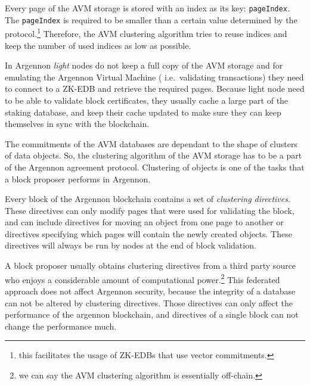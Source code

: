 Every page of the AVM storage is stored with an index as its key: \texttt{pageIndex}. The \texttt{pageIndex} is
required to be smaller than a certain value determined by the
protocol.\footnote{this facilitates the usage of ZK-EDBs that use vector commitments.}
Therefore, the AVM clustering algorithm tries to reuse indices and keep the number of used indices as low as
possible.

In Argennon \emph{light} nodes do not keep a full copy of the AVM storage and for emulating the Argennon Virtual Machine
( i.e.~validating transactions) they need to connect to a ZK-EDB and retrieve the required pages.
Because light node need to be able to validate block certificates, they usually cache a large part of the staking
database, and keep their cache updated to make sure they can keep themselves in sync with the blockchain.

The commitments of the AVM databases are dependant to the shape of clusters of data objects. So,
the clustering algorithm of the AVM storage has to be a part of the Argennon agreement protocol. Clustering of
objects is one of the tasks that a block proposer performs in Argennon.

Every block of the Argennon blockchain contains a set of \emph{clustering directives}. These directives
can only modify pages that were used for validating the block, and can
include directives for moving an object from one page to another or directives specifying which pages will contain
the newly created objects. These directives will always be run by nodes at the end of block validation.

A block proposer usually obtains clustering directives from a third party source who enjoys a considerable amount of
computational power.\footnote{we can say the AVM clustering algorithm is essentially off-chain.} This federated approach
does not affect Argennon security, because the integrity of a database can not be altered by clustering directives.
Those directives can only affect the performance of the argennon blockchain, and directives of a single block can
not change the performance much.
